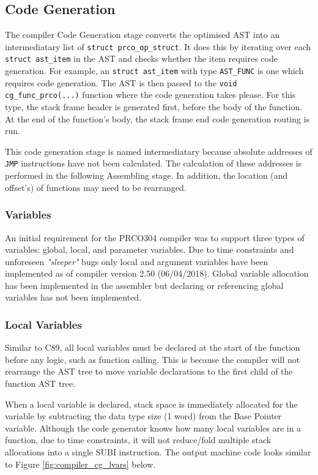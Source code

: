 \documentclass[11pt,a4paper]{report}
\newcommand{\scname}{PRCO304}
\begin{document}
\subsection{Code Generation}
The compiler Code Generation stage converts the optimised AST into an intermediatary list of \texttt{struct prco_op_struct}. It does this by iterating over each \texttt{struct ast_item} in the AST and checks whether the item requires code generation. For example, an \texttt{struct ast_item} with type \texttt{AST_FUNC} is one which requires code generation. The AST is then passed to the \texttt{void cg_func_prco(...)} function where the code generation takes please. For this type, the stack frame header is generated first, before the body of the function. At the end of the function's body, the stack frame end code generation routing is run.

This code generation stage is named intermediatary because absolute addresses of \verb|JMP| instructions have not been calculated. The calculation of these addresses is performed in the following Assembling stage. In addition, the location (and offset's) of functions may need to be rearranged.

\subsubsection{Variables}
\label{sect:compiler_cg_vars}
An initial requirement for the \scname{} compiler was to support three types of variables: global, local, and parameter variables. Due to time constraints and unforeseen \textit{"sleeper"} bugs only local and argument variables have been implemented as of compiler version 2.50 (06/04/2018). Global variable allocation has been implemented in the assembler but declaring or referencing global variables has not been implemented.

\subsubsection*{Local Variables}
Similar to C89, all local variables must be declared at the start of the function before any logic, such as function calling. This is because the compiler will not rearrange the AST tree to move variable declarations to the first child of the function AST tree.

When a local variable is declared, stack space is immediately allocated for the variable by subtracting the data type size (1 word) from the Base Pointer variable. Although the code generator knows how many local variables are in a function, due to time constraints, it will not reduce/fold multiple stack allocations into a single SUBI instruction. The output machine code looks similar to Figure \ref{fig:compiler_cg_lvars} below.
\end{document}
